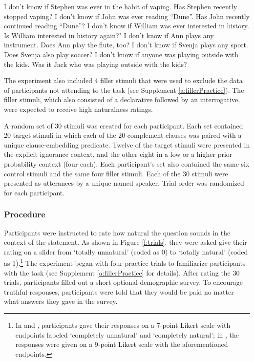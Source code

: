 \documentclass[11pt,fleqn]{article}
\newcommand{\6}{\mbox{$[\hspace*{-.6mm}[$}}
\newcommand{\9}{\mbox{$]\hspace*{-.6mm}]$}}
\begin{document}
\begin{exe}
\ex\label{filler} 
\begin{xlist}
\ex I don't know if Stephen was ever in the habit of vaping. Has Stephen recently stopped vaping?
\ex I don't know if John was ever reading ``Dune''. Has John recently continued reading ``Dune''?
\ex I don't know if William was ever interested in history. Is William interested in history again?"
\ex I don't know if Ann plays any instrument. Does Ann play the flute, too?
\ex I don't know if Svenja plays any sport. Does Svenja also play soccer?
\ex I don't know if anyone was playing outside with the kids. Was it Jack who was playing outside with the kids?

\end{xlist}
\end{exe}

The experiment also included 4 filler stimuli that were used to exclude the data of participants not attending to the task (see Supplement \ref{a:fillerPractice}). The filler stimuli, which also consisted of a declarative followed by an interrogative, were expected to receive high naturalness ratings.

A random set of 30 stimuli was created for each participant. Each set contained 20 target stimuli in which each of the 20 complement clauses was paired with a unique clause-embedding predicate. Twelve of the target stimuli were presented in the explicit ignorance context, and the other eight in a low or a higher prior probability context (four each). Each participant's set also contained the same six control stimuli and the same four filler stimuli. Each of the 30 stimuli were presented as utterances by a unique named speaker. Trial order was randomized for each participant. 

\subsubsection{Procedure}

Participants were instructed to rate how natural the question sounds in the context of the statement. As shown in Figure \ref{f:trials}, they were asked give their rating on a slider from `totally unnatural' (coded as 0) to `totally natural' (coded as 1).\footnote{In \citealt[Exp.~3]{mandelkern-etal2020} and \citealt[Exp.1]{kalomoiros-schwarz2024}, participants gave their responses on a 7-point Likert scale with endpoints labeled `completely unnatural' and `completely natural';  in \citealt[Exp.~2]{kalomoiros-schwarz2024}, the responses were given on a 9-point Likert scale with the aforementioned endpoints.}
The experiment began with four practice trials to familiarize participants with the task (see Supplement \ref{a:fillerPractice} for details). After rating the 30 trials, participants filled out a short optional demographic survey. To encourage truthful responses, participants were told that they would be paid no matter what answers they gave in the survey.
\end{document}
